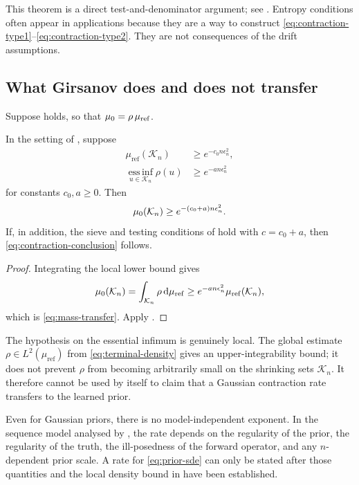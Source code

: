 This theorem is a direct test-and-denominator argument; see
.  Entropy conditions often appear in
applications because they are a way to construct
\eqref{eq:contraction-type1}--\eqref{eq:contraction-type2}.  They are
not consequences of the drift assumptions.

\subsection{What Girsanov does and does not transfer}

Suppose  holds, so that
${\mu_{0}}=\rho\,\mu_{\mathrm{ref}}$.

\begin{corollary}
\label{cor:local-mass-transfer}
In the setting of , suppose
\begin{align}
  \mu_{\mathrm{ref}}(\mathcal K_n)
    &\geq e^{-c_0n\epsilon_n^2},\\
  \operatorname*{ess\,inf}_{u\in\mathcal K_n}
    \rho(u)
    &\geq e^{-a n\epsilon_n^2}
\end{align}
for constants $c_0,a\geq0$.  Then
\begin{equation}
  {\mu_{0}}(\mathcal K_n)
  \geq e^{-(c_0+a)n\epsilon_n^2}.
  \label{eq:mass-transfer}
\end{equation}
If, in addition, the sieve and testing conditions of
 hold with $c=c_0+a$, then
\eqref{eq:contraction-conclusion} follows.
\end{corollary}

\begin{proof}
Integrating the local lower bound gives
\[
  {\mu_{0}}(\mathcal K_n)
  =\int_{\mathcal K_n}\rho\,\mathrm d\mu_{\mathrm{ref}}
  \geq e^{-a n\epsilon_n^2}
       \mu_{\mathrm{ref}}(\mathcal K_n),
\]
which is \eqref{eq:mass-transfer}.  Apply
.
\end{proof}

The hypothesis on the essential infimum is genuinely local.
The global estimate $\rho\in L^2(\mu_{\mathrm{ref}})$ from
\eqref{eq:terminal-density} gives an upper-integrability bound; it
does not prevent $\rho$ from becoming arbitrarily small on the
shrinking sets $\mathcal K_n$.  It therefore cannot be used by itself
to claim that a Gaussian contraction rate transfers to the learned
prior.

Even for Gaussian priors, there is no model-independent exponent.  In
the sequence model analysed by \citet{knapik2011}, the rate depends on
the regularity of the prior, the regularity of the truth, the
ill-posedness of the forward operator, and any $n$-dependent prior
scale.  A rate for \eqref{eq:prior-sde} can only be stated after those
quantities and the local density bound in
 have been established.

